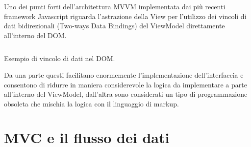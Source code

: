 \noindent
Uno dei punti forti dell'architettura MVVM implementata dai più recenti framework Javascript riguarda l'astrazione della View per l'utilizzo dei vincoli di dati bidirezionali (Two-ways Data Bindings) del ViewModel direttamente all'interno del DOM.

\begin{listing}[ht]
\inputminted{jsx}{sources/exampleMVVMDataBinding.js}
\caption{Esempio di vincolo di dati nel DOM.}
\label{exampleMVVMDataBinding}
\end{listing}

\noindent
Da una parte questi facilitano enormemente l'implementazione dell'interfaccia e consentono di ridurre in maniera considerevole la logica da implementare a parte all'interno del ViewModel, dall'altra sono considerati un tipo di programmazione obsoleta che mischia la logica con il linguaggio di markup.

\section{MVC e il flusso dei dati}